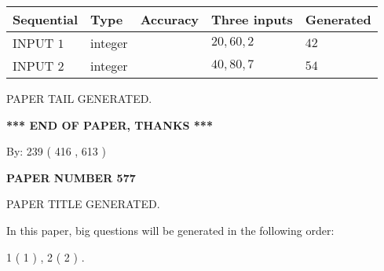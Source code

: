 \documentclass[12pt]{article}
\begin{document}
   
  
  
\noindent\begin{tabular}{|l|l|l|l|l|}
\hline
 Sequential & Type & Accuracy & Three inputs & Generated \\ 
\hline
 
 
  INPUT $  1 $ & integer &  & $
 20
 , 
 60
 , 
 2
 $ & $ 42 $ 
 \\  \hline  
 
 
  INPUT $  2 $ & integer &  & $
 40
 , 
 80
 , 
 7
 $ & $ 54 $ 
 \\  \hline  
 \end{tabular}
   
   
   
   
   
   
 \vspace{0.2in}
 
   
   
\vspace{2.0in} PAPER TAIL GENERATED.
   
   
   
   
\vspace{1.0in} 
{\textbf{\large{ *** END OF PAPER, THANKS *** }}} 
   
   
\hspace{1.0in} By: 
 239 ( 416 ,  613 )
   
   
   
   
\newpage 
\setcounter{page}{ 
   577001 } 
   
   
   
   
 {\textbf{ \Large{ PAPER NUMBER  577  }}}
   
   
\vspace{0.2in}
   
   
   
   
   
   
   
   
 \vspace{0.2in}
 
 
 
 
   
   
 PAPER TITLE GENERATED.
   
   
   
\vspace{0.2in}
   
In this paper, big questions will be generated in the following order: 
   
   
   1 ( 1 )
 ,
   2 ( 2 )
 .
  
\end{document}
